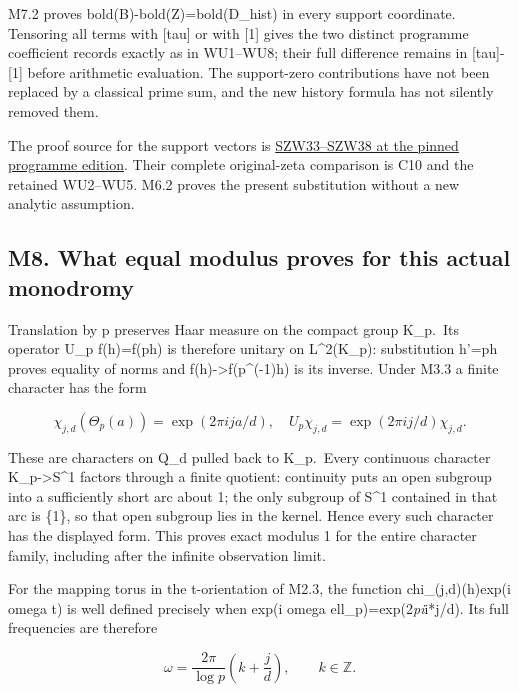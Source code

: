 \documentclass[
]{article}
\begin{document}
M7.2 proves bold(B)-bold(Z)=bold(D\_hist) in every support coordinate.
Tensoring all terms with {[}tau{]} or with {[}1{]} gives the two
distinct programme coefficient records exactly as in WU1--WU8; their
full difference remains in {[}tau{]}-{[}1{]} before arithmetic
evaluation. The support-zero contributions have not been replaced by a
classical prime sum, and the new history formula has not silently
removed them.

The proof source for the support vectors is
\href{https://github.com/KokunoYumeto/zeta-function-research-reader/blob/76f421965914beb133df797835f940849844dc4f/workbenches/splitzero-tandem/branches/tau-zero-prime-positivity/SUPPORTED_ZERO_PRIME_WEIL_DERIVATION.md}{SZW33--SZW38
at the pinned programme edition}. Their complete original-zeta
comparison is C10 and the retained WU2--WU5. M6.2 proves the present
substitution without a new analytic assumption.

\subsection{M8. What equal modulus proves for this actual
monodromy}\label{m8.-what-equal-modulus-proves-for-this-actual-monodromy}

Translation by p preserves Haar measure on the compact group K\_p.~Its
operator U\_p f(h)=f(ph) is therefore unitary on L\^{}2(K\_p):
substitution h'=ph proves equality of norms and
f(h)-\textgreater f(p\^{}(-1)h) is its inverse. Under M3.3 a finite
character has the form

\[
\chi_{j,d}(\Theta_p(a))=\exp(2\pi i j a/d),
\quad U_p\chi_{j,d}=\exp(2\pi i j/d)\chi_{j,d}.
\tag{M8.1}
\]

These are characters on Q\_d pulled back to K\_p.~Every continuous
character K\_p-\textgreater S\^{}1 factors through a finite quotient:
continuity puts an open subgroup into a sufficiently short arc about 1;
the only subgroup of S\^{}1 contained in that arc is \{1\}, so that open
subgroup lies in the kernel. Hence every such character has the
displayed form. This proves exact modulus 1 for the entire character
family, including after the infinite observation limit.

For the mapping torus in the t-orientation of M2.3, the function
chi\_(j,d)(h)exp(i omega t) is well defined precisely when exp(i omega
ell\_p)=exp(2\emph{pi}i*j/d). Its full frequencies are therefore

\[
\omega=\frac{2\pi}{\log p}\left(k+\frac jd\right),\qquad k\in\mathbb Z.
\tag{M8.2}
\]
\end{document}
